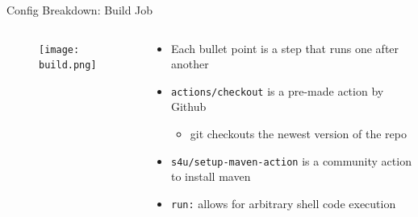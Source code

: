 \documentclass[compress,aspectratio=169]{beamer}
\begin{document}
	\begin{frame}{Config Breakdown: Build Job}
    \begin{columns}
      \begin{column}{0.5\textwidth}
        \begin{figure}
          \begin{center}
            \texttt{[image: build.png]}
          \end{center}
        \end{figure}
      \end{column}
      \begin{column}{0.5\textwidth}
        \begin{itemize}
          \item Each bullet point is a step that runs one after another
          \item \texttt{actions/checkout} is a pre-made action by Github
            \begin{itemize}
              \item git checkouts the newest version of the repo
            \end{itemize}
          \item \texttt{s4u/setup-maven-action} is a community action to install maven
          \item \texttt{run:} allows for arbitrary shell code execution
        \end{itemize}
      \end{column}
    \end{columns}
	\end{frame}
\end{document}
